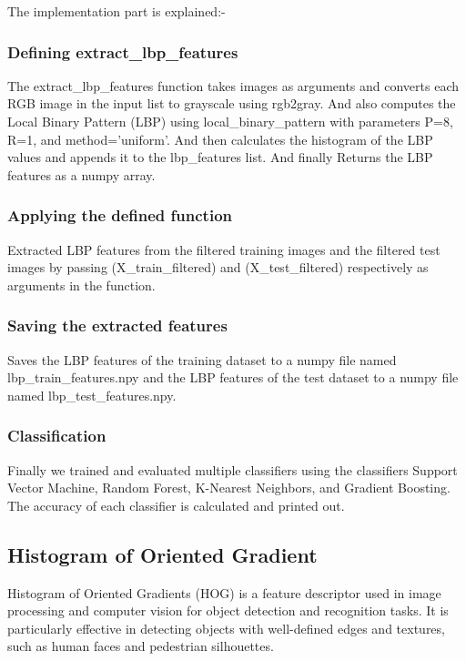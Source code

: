 \documentclass[a4paper]{article}
\theoremstyle{plain}
\theoremstyle{definition}
\begin{document}
    The implementation part is explained:-
    \subsubsection{Defining extract\_lbp\_features}
    The extract\_lbp\_features function takes images as arguments and converts each RGB image in the input list to grayscale using rgb2gray.
    And also computes the Local Binary Pattern (LBP) using local\_binary\_pattern with parameters P=8, R=1, and method='uniform'.
    And then calculates the histogram of the LBP values and appends it to the lbp\_features list. And finally Returns the LBP features as a numpy array.

    \subsubsection{Applying the defined function}
    Extracted LBP features from the filtered training images and the filtered test images by passing (X\_train\_filtered) and (X\_test\_filtered) respectively as arguments in the function.

    \subsubsection{Saving the extracted features}
    Saves the LBP features of the training dataset to a numpy file named lbp\_train\_features.npy and the LBP features of the test dataset to a numpy file named lbp\_test\_features.npy.

    \subsubsection{Classification}
    Finally we trained and evaluated multiple classifiers using the classifiers Support Vector Machine, Random Forest, K-Nearest Neighbors, and Gradient Boosting. The accuracy of each classifier is calculated and printed out.

        \subsection{Histogram of Oriented Gradient}

Histogram of Oriented Gradients (HOG) is a feature descriptor used in image processing and computer vision for object detection and recognition tasks. It is particularly effective in detecting objects with well-defined edges and textures, such as human faces and pedestrian silhouettes. 
\end{document}
